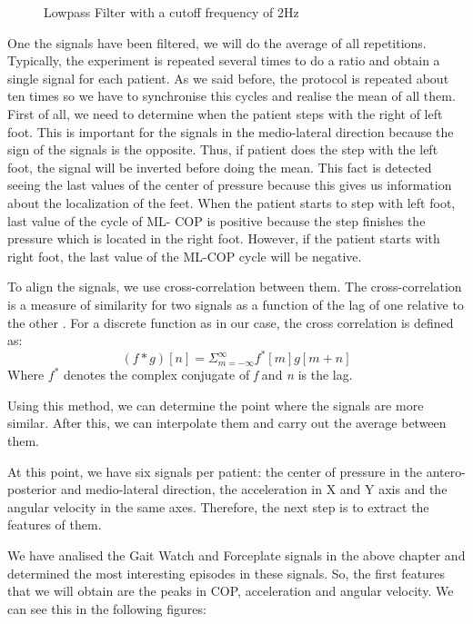 \begin{figure}[H]
	\centering
	\caption{Lowpass Filter with a cutoff frequency of 2Hz}
	\label{fig:lowpassFilter}
\end{figure} 

One the signals have been filtered, we will do the average of all repetitions. Typically, the experiment is repeated several times to do a ratio and obtain a single signal for each patient. As we said before, the protocol is repeated about ten times so we have to synchronise this cycles and realise the mean of all them.  First of all, we need to determine when the patient steps with the right of left foot. This is important for the signals in the medio-lateral direction because the sign of the signals is the opposite. Thus, if patient does the step with the left foot, the signal will be inverted before doing the mean. This fact is detected seeing the last values of the center of pressure because this gives us information about the localization of the feet.
When the patient starts to step with left foot, last value of the cycle of ML- COP is positive because the step finishes the pressure which is located in the right foot. However, if the patient starts with right foot, the last value of the ML-COP cycle will be negative.

To align the signals, we use cross-correlation between them. The cross-correlation is a measure of similarity for two signals as a function of the lag of one relative to the other \cite{Cross-corr}. For a discrete function as in our case, the cross correlation is defined as:
\begin{equation}
\label{cross-corr}
(f*g)[n]=\varSigma_{m=-\infty}^{\infty} f^{*}[m]g[m+n]
\end{equation}
Where $ f^{*}$ denotes the complex conjugate of \textit{f} and \textit{n} is the lag.

Using this method, we can determine the point where the signals are more similar. After this, we can interpolate them and carry out the average between them.

At this point, we have six signals per patient: the center of pressure in the antero-posterior and medio-lateral direction, the acceleration in X and Y axis and the angular velocity in the same axes. Therefore, the next step is to extract the features of them. 

We have analised the Gait Watch and Forceplate signals in the above chapter and determined the most interesting episodes in these signals. So, the first features that we will obtain are the peaks in COP, acceleration and angular velocity. We can see this in the following figures:

